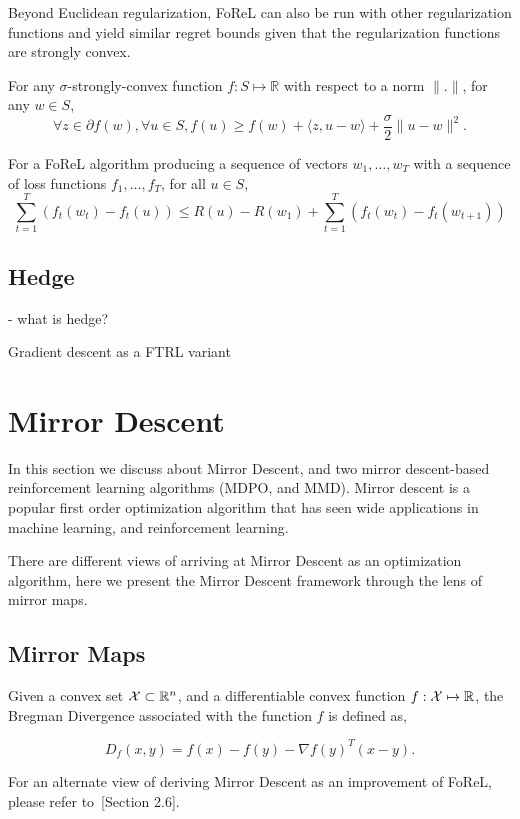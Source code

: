 Beyond Euclidean regularization, FoReL can also be run with other regularization functions and
yield similar regret bounds given that the regularization functions are strongly convex.

\begin{definition}
	For any $\sigma$-strongly-convex function $f: S \mapsto \mathbb{R}$ with respect to a norm $\|.
		\|$, for any $w \in S$,
	\begin{equation}
		\forall z \in \partial f(w), \forall u \in S, f(u) \geq f(w) + \langle z, u - w\rangle + \frac{\sigma}{2}\| u - w \|^2.
	\end{equation}
\end{definition}

\begin{lemma}
	\label{lem:forelrb}
	For a FoReL algorithm producing a sequence of vectors $w_1, \ldots, w_T$ with a sequence of loss
	functions $f_1, \ldots, f_T$, for all $u \in S$, $$\sum_{t=1}^T (f_t(w_t) - f_t(u)) \leq R(u) -
		R(w_1) + \sum_{t=1}^T (f_t(w_t) - f_t(w_{t+1}))$$
\end{lemma}

\subsection{Hedge} - what is hedge?

Gradient descent as a FTRL variant


\section{Mirror Descent}

In this section we discuss about Mirror Descent, and two mirror descent-based reinforcement
learning algorithms (MDPO, and MMD).
Mirror descent is a popular first order optimization algorithm that has seen wide applications in
machine learning, and reinforcement learning.

There are different views of arriving at Mirror Descent as an optimization algorithm, here we
present the Mirror Descent framework through the lens of mirror maps.

\subsection{Mirror Maps}

\begin{definition}
	\label{def:bregman}
	Given a convex set $\mathcal{X} \subset \mathbb{R}^n$, and a differentiable convex function $f: \mathcal{X} \mapsto
		\mathbb{R}$, the Bregman Divergence associated with the function $f$ is defined as,

	$$
		D_f(x, y) = f(x) - f(y) - \nabla f(y)^T (x-y).
	$$
\end{definition}

For an alternate view of deriving Mirror Descent as an improvement of FoReL, please refer
to~\cite{shalev-shwartzOnline2012}[Section 2.6].
